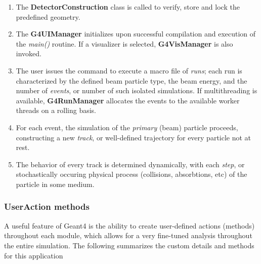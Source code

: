 \documentclass{mc2015}
\begin{document}
\begin{enumerate}
\item The \textbf{DetectorConstruction} class is called to verify, store and lock the predefined geometry.
\item The \textbf{G4UIManager} initializes upon successful compilation and execution of the \emph{main()} routine.  If a visualizer is selected, \textbf{G4VisManager} is also invoked.
\item The user issues the command to execute a macro file of \emph{runs}; each run is characterized by the defined beam particle type, the beam energy, and the number of \emph{events}, or number of such isolated simulations.  If multithreading is available, \textbf{G4RunManager} allocates the events to the available worker threads on a rolling basis.
\item For each event, the simulation of the \emph{primary} (beam) particle proceeds, constructing a new \emph{track}, or well-defined trajectory for every particle not at rest.
\item The behavior of every track is determined dynamically, with each \emph{step}, or stochastically occuring physical process (collisions, absorbtions, etc) of the particle in some medium.
\end{enumerate}

\subsubsection{UserAction methods}

A useful feature of Geant4 is the ability to create user-defined actions (methods) throughout each module, which allows for a very fine-tuned analysis throughout the entire simulation.  The following summarizes the custom details and methods for this application
\end{document}
